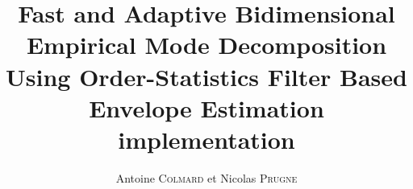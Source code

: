 \documentclass[a4paper, 11pt]{report}
\begin{document}
\frenchspacing
{}

\title{Fast and Adaptive Bidimensional Empirical Mode Decomposition Using Order-Statistics Filter Based Envelope Estimation implementation}
\author{Antoine \textsc{Colmard} et Nicolas \textsc{Prugne}}
\maketitle

\tableofcontents
\listoffigures






\nocite{*}


 
\end{document}
